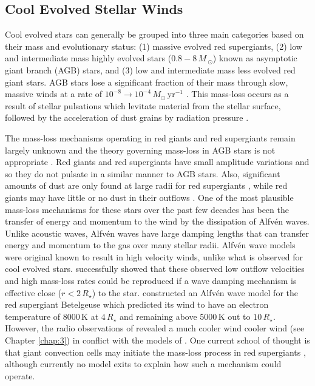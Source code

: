 \subsection{Cool Evolved Stellar Winds}\label{sec:1.4.3}
Cool evolved stars can generally be grouped into three main categories based on their mass and evolutionary status: (1) massive evolved red supergiants, (2) low and intermediate mass highly evolved stars ($0.8 - 8\,M\,_{\odot}$) known as asymptotic giant branch (AGB) stars, and (3) low and intermediate mass less evolved red giant stars. AGB stars lose a significant fraction of their mass through slow, massive winds at a rate of $10^{-8} \rightarrow 10^{-4}\,M_{\odot}$\,yr$^{-1}$ \citep{van_loon_2005}. This mass-loss occurs as a result of stellar pulsations \citep{habing_1996} which levitate material from the stellar surface, followed by the acceleration of dust grains by radiation pressure \citep{gehrz_1971}. 

The mass-loss mechanisms operating in red giants and red supergiants remain largely unknown and the theory governing mass-loss in AGB stars is not appropriate \citep{josselin_2007}. Red giants and red supergiants have small amplitude variations and so they do not pulsate in a similar manner to AGB stars. Also, significant amounts of dust are only found at large radii for red supergiants \citep{danchi_1994}, while red giants may have little or no dust in their outflows \citep{jones_2008}. One of the most plausible mass-loss mechanisms for these stars over the past few decades has been the transfer of energy and momentum to the wind by the dissipation of Alfv\'en waves. Unlike acoustic waves, Alfv\'en waves have large damping lengths that can transfer energy and momentum to the gas over many stellar radii. Alfv\'en wave models were original known to result in high velocity winds, unlike what is observed for cool evolved stars. \cite{hartmann_1980} successfully showed that these observed low outflow velocities and high mass-loss rates could be reproduced if a wave damping mechanism is effective close ($r < 2\,R_{\star}$) to the star. \cite{hartmann_1984} constructed an Alfv\'en wave model for the red supergiant Betelgeuse which predicted its wind to have an electron temperature of 8000\,K at $4\,R_{\star}$ and remaining above 5000\,K out to $10\,R_{\star}$. However, the radio observations of \cite{lim_1998} revealed a much cooler wind cooler wind (see Chapter \ref{chap:3}) in conflict with the models of \cite{hartmann_1984}. One current school of thought is that giant convection cells may initiate the mass-loss process in red supergiants \cite[e.g.,][]{lim_1998}, although currently no model exits to explain how such a mechanism could operate.

